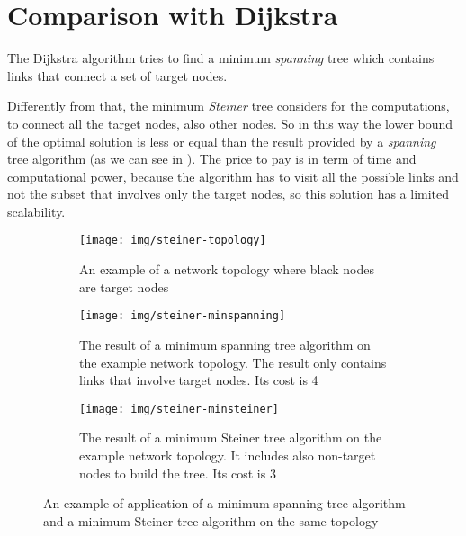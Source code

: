 \section{Comparison with Dijkstra}\label{sec:comparison}

The Dijkstra algorithm tries to find a minimum \emph{spanning} tree which
contains links that connect a set of target nodes.

Differently from that, the minimum \emph{Steiner} tree considers for the
computations, to connect all the target nodes, also other nodes. So in this way
the lower bound of the optimal solution is less or equal than the result
provided by a \emph{spanning} tree algorithm (as we can see in
). The price to pay is in term of time and computational
power, because the algorithm has to visit all the possible links and not the
subset that involves only the target nodes, so this solution has a limited
scalability.

\begin{figure}
	\centering
	\begin{subfigure}[b]{0.3\textwidth}
		\centering
		\texttt{[image: img/steiner-topology]}
		\caption{An example of a network topology where black nodes are
		target nodes}\label{subfig:steiner-topology}
	\end{subfigure}
	\begin{subfigure}[b]{0.3\textwidth}
		\centering
		\texttt{[image: img/steiner-minspanning]}
		\caption{The result of a minimum spanning tree algorithm on the
		example network topology. The result only contains links that
		involve target nodes. Its cost is
		4}\label{subfig:steiner-minspanning}
	\end{subfigure}
	\begin{subfigure}[b]{0.3\textwidth}
		\centering
		\texttt{[image: img/steiner-minsteiner]}
		\caption{The result of a minimum Steiner tree algorithm on the
		example network topology. It includes also non-target nodes to
		build the tree. Its cost is 3}\label{subfig:steiner-minsteiner}
	\end{subfigure}
	\caption{An example of application of a minimum spanning tree algorithm
		and a minimum Steiner tree algorithm on the same
		topology}\label{fig:steiner}
\end{figure}
